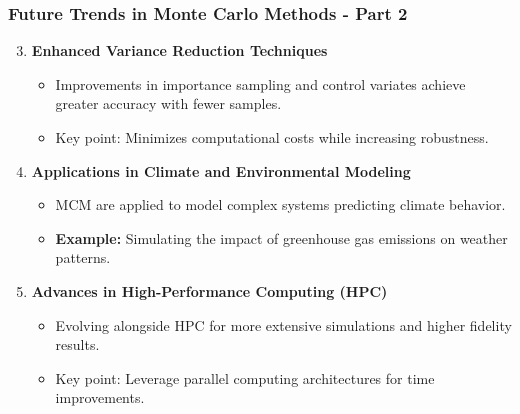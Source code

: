 \documentclass[aspectratio=169]{beamer}
\begin{document}
\begin{frame}[fragile]
    \frametitle{Future Trends in Monte Carlo Methods - Part 2}
    \begin{enumerate}
        \setcounter{enumi}{2}
        \item \textbf{Enhanced Variance Reduction Techniques}
            \begin{itemize}
                \item Improvements in importance sampling and control variates achieve greater accuracy with fewer samples.
                \item Key point: Minimizes computational costs while increasing robustness.
            \end{itemize}

        \item \textbf{Applications in Climate and Environmental Modeling}
            \begin{itemize}
                \item MCM are applied to model complex systems predicting climate behavior.
                \item \textbf{Example:} Simulating the impact of greenhouse gas emissions on weather patterns.
            \end{itemize}

        \item \textbf{Advances in High-Performance Computing (HPC)}
            \begin{itemize}
                \item Evolving alongside HPC for more extensive simulations and higher fidelity results.
                \item Key point: Leverage parallel computing architectures for time improvements.
            \end{itemize}
    \end{enumerate}
\end{frame}
\end{document}
